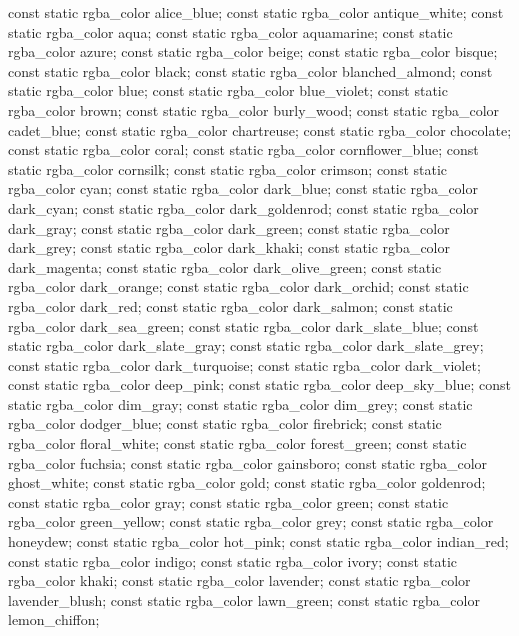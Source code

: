 \begin{codeblock}
{{{{{    const static rgba_color alice_blue;
    const static rgba_color antique_white;
    const static rgba_color aqua;
    const static rgba_color aquamarine;
    const static rgba_color azure;
    const static rgba_color beige;
    const static rgba_color bisque;
    const static rgba_color black;
    const static rgba_color blanched_almond;
    const static rgba_color blue;
    const static rgba_color blue_violet;
    const static rgba_color brown;
    const static rgba_color burly_wood;
    const static rgba_color cadet_blue;
    const static rgba_color chartreuse;
    const static rgba_color chocolate;
    const static rgba_color coral;
    const static rgba_color cornflower_blue;
    const static rgba_color cornsilk;
    const static rgba_color crimson;
    const static rgba_color cyan;
    const static rgba_color dark_blue;
    const static rgba_color dark_cyan;
    const static rgba_color dark_goldenrod;
    const static rgba_color dark_gray;
    const static rgba_color dark_green;
    const static rgba_color dark_grey;
    const static rgba_color dark_khaki;
    const static rgba_color dark_magenta;
    const static rgba_color dark_olive_green;
    const static rgba_color dark_orange;
    const static rgba_color dark_orchid;
    const static rgba_color dark_red;
    const static rgba_color dark_salmon;
    const static rgba_color dark_sea_green;
    const static rgba_color dark_slate_blue;
    const static rgba_color dark_slate_gray;
    const static rgba_color dark_slate_grey;
    const static rgba_color dark_turquoise;
    const static rgba_color dark_violet;
    const static rgba_color deep_pink;
    const static rgba_color deep_sky_blue;
    const static rgba_color dim_gray;
    const static rgba_color dim_grey;
    const static rgba_color dodger_blue;
    const static rgba_color firebrick;
    const static rgba_color floral_white;
    const static rgba_color forest_green;
    const static rgba_color fuchsia;
    const static rgba_color gainsboro;
    const static rgba_color ghost_white;
    const static rgba_color gold;
    const static rgba_color goldenrod;
    const static rgba_color gray;
    const static rgba_color green;
    const static rgba_color green_yellow;
    const static rgba_color grey;
    const static rgba_color honeydew;
    const static rgba_color hot_pink;
    const static rgba_color indian_red;
    const static rgba_color indigo;
    const static rgba_color ivory;
    const static rgba_color khaki;
    const static rgba_color lavender;
    const static rgba_color lavender_blush;
    const static rgba_color lawn_green;
    const static rgba_color lemon_chiffon;
}}}}}
\end{codeblock}
